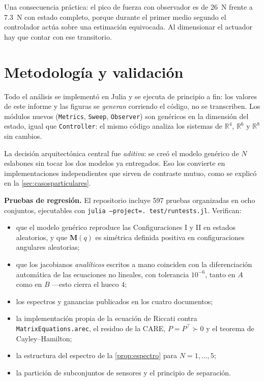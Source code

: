 \documentclass[11pt,letterpaper]{article}
\theoremstyle{definition}
\theoremstyle{plain}
\theoremstyle{remark}
\newcommand{\R}{\mathbb{R}}
\newcommand{\Mm}{\bm{M}}
\begin{document}
Una consecuencia práctica: el pico de fuerza con observador es de 26~N frente a
7.3~N con estado completo, porque durante el primer medio segundo el controlador
actúa sobre una estimación equivocada. Al dimensionar el actuador hay que contar
con ese transitorio.

\section{Metodología y validación}
\label{sec:metodologia}

Todo el análisis se implementó en Julia y se ejecuta de principio a fin: los
valores de este informe y las figuras se \emph{generan} corriendo el código, no
se transcriben. Los módulos nuevos (\texttt{Metrics}, \texttt{Sweep},
\texttt{Observer}) son genéricos en la dimensión del estado, igual que
\texttt{Controller}: el mismo código analiza los sistemas de $\R^4$, $\R^6$ y
$\R^8$ sin cambios.

La decisión arquitectónica central fue \emph{aditiva}: se creó el modelo
genérico de $N$ eslabones sin tocar los dos modelos ya entregados. Eso los
convierte en implementaciones independientes que sirven de contraste mutuo,
como se explicó en la \cref{sec:casosparticulares}.

\textbf{Pruebas de regresión.} El repositorio incluye 597 pruebas organizadas en
ocho conjuntos, ejecutables con
\texttt{julia --project=. test/runtests.jl}. Verifican:

\begin{itemize}
  \item que el modelo genérico reproduce las Configuraciones I y II en estados
  aleatorios, y que $\Mm(q)$ es simétrica definida positiva en configuraciones
  angulares aleatorias;
  \item que los jacobianos \emph{analíticos} escritos a mano coinciden con la
  diferenciación automática de las ecuaciones no lineales, con tolerancia
  $10^{-6}$, tanto en $A$ como en $B$ ---esto cierra el hueco 4;
  \item los espectros y ganancias publicados en los cuatro documentos;
  \item la implementación propia de la ecuación de Riccati contra
  \texttt{MatrixEquations.arec}, el residuo de la CARE, $P=P^\top\succ0$ y el
  teorema de Cayley--Hamilton;
  \item la estructura del espectro de la \cref{prop:espectro} para
  $N=1,\dots,5$;
  \item la partición de subconjuntos de sensores y el principio de separación.
\end{itemize}
\end{document}
